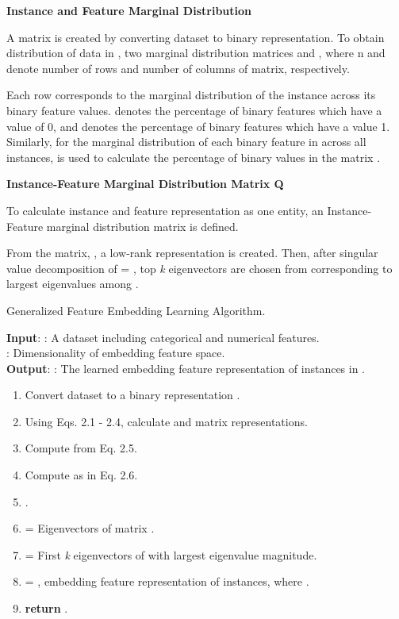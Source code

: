 \documentclass{article}
\begin{document}
\textbf{Instance and Feature Marginal Distribution}

A matrix  is created by converting dataset  to binary representation. To obtain distribution of data in , two marginal distribution matrices  and , where n and  denote number of rows and number of columns of  matrix, respectively.

Each row  corresponds to the marginal distribution of the instance  across its binary feature values.  denotes the percentage of binary features which have a value of 0, and  denotes the percentage of binary features which have a value 1. Similarly, for the marginal distribution of each binary feature in  across all instances,  is used to calculate the percentage of binary values in the matrix . 






\textbf{Instance-Feature Marginal Distribution Matrix Q}

To calculate instance and feature representation as one entity, an Instance-Feature marginal distribution matrix  is defined.



From the matrix, , a low-rank representation  is created.
Then, after singular value decomposition of  = , top \textit{k} eigenvectors are chosen from  corresponding to largest eigenvalues among .




\begin{algorithm}[htbp]
\caption{Generalized Feature Embedding Learning Algorithm.~\cite{gel}}
\label{alg:gel}
\textbf{Input}: : A dataset including categorical and numerical features.\\
                : Dimensionality of embedding feature space.\\
\textbf{Output}:  : The learned embedding feature representation of instances in .

\begin{enumerate}
    \item Convert dataset  to a binary representation .
    \item Using Eqs. 2.1 - 2.4, calculate  and  matrix representations.
    \item Compute  from Eq. 2.5.
    \item Compute  as in Eq. 2.6.
    \item .
    \item  =  Eigenvectors of matrix .
    \item  = First \textit{k} eigenvectors of  with largest eigenvalue magnitude.
    \item  = , embedding feature representation of instances, where . 
    \item \textbf{return} .
\end{enumerate}

\end{algorithm}
\end{document}
